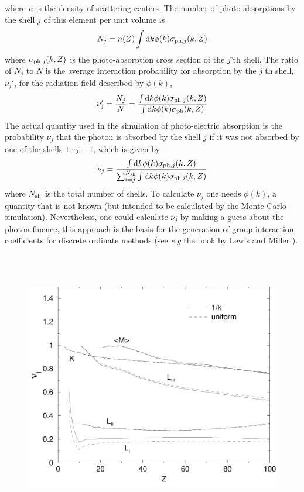 \begin{enumerate}
where $n$ is the density of scattering centers. 
The number of photo-absorptions by the shell $j$ of this 
element per unit volume is
\begin{equation}
N_j = n(Z) \int {\rm d} k \phi(k) \sigma_{{\rm ph},j}(k,Z)
\end{equation}
where $\sigma_{{\rm ph},j}(k,Z)$ is the photo-absorption cross section 
of the $j$'th shell. The ratio of $N_j$ to $N$ is the average 
interaction probability for absorption by the $j$'th shell, $\nu_j'$, 
for the radiation field described by $\phi(k)$,
\begin{equation}
\nu_j' = \frac{N_j}{N} = {\int {\rm d} k \phi(k) \sigma_{{\rm ph},j}(k,Z) 
\over \int {\rm d} k \phi(k) \sigma_{\rm ph}(k,Z) }
\end{equation}
The actual quantity used in the simulation of photo-electric absorption 
is the probability $\nu_j$ that the photon is absorbed by the 
shell $j$  if it was not absorbed by one of the shells $1 \cdots j-1$,  
which is given by
\begin{equation}
\label{photo_nuj}
\nu_j = {\int {\rm d} k \phi(k) \sigma_{{\rm ph},j}(k,Z) \over 
\sum_{i=j}^{N_{\rm sh}} \int {\rm d} k \phi(k) \sigma_{{\rm ph},i}(k,Z)}
\end{equation}
where $N_{\rm sh}$ is the total number of shells. 
To calculate $\nu_j$ one needs $\phi(k)$, a quantity that 
is not known (but intended to be calculated by the Monte 
Carlo simulation). Nevertheless, one could calculate 
$\nu_j$ by making a guess about the photon fluence, this 
approach is the basis for the generation of group interaction 
coefficients for discrete ordinate methods (see {\em e.g} 
the book by Lewis and Miller \cite{LM84}). 
\begin{figure}[h]
\includegraphics[height=12cm,width=12cm]{figures/intp}

\end{figure}
\end{enumerate}

